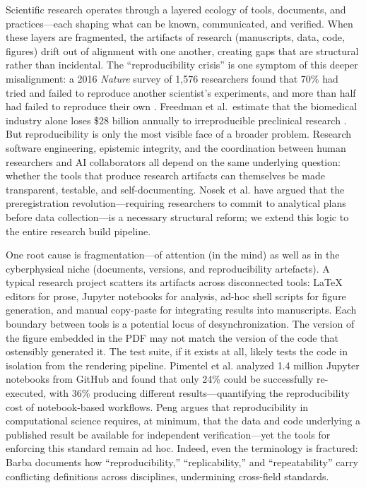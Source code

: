 \documentclass[
]{article}
\begin{document}
Scientific research operates through a layered ecology of tools,
documents, and practices---each shaping what can be known, communicated,
and verified. When these layers are fragmented, the artifacts of
research (manuscripts, data, code, figures) drift out of alignment with
one another, creating gaps that are structural rather than incidental.
The ``reproducibility crisis'' is one symptom of this deeper
misalignment: a 2016 \emph{Nature} survey of 1,576 researchers found
that 70\% had tried and failed to reproduce another scientist's
experiments, and more than half had failed to reproduce their own
\citep{baker2016reproducibility}. Freedman et al.~estimate that the
biomedical industry alone loses \$28 billion annually to irreproducible
preclinical research \citep{freedman2015economics}. But reproducibility
is only the most visible face of a broader problem. Research software
engineering, epistemic integrity, and the coordination between human
researchers and AI collaborators all depend on the same underlying
question: whether the tools that produce research artifacts can
themselves be made transparent, testable, and self-documenting. Nosek et
al. \citep{nosek2018preregistration} have argued that the
preregistration revolution---requiring researchers to commit to
analytical plans before data collection---is a necessary structural
reform; we extend this logic to the entire research build pipeline.

One root cause is fragmentation---of attention (in the mind) as well as
in the cyberphysical niche (documents, versions, and reproducibility
artefacts). A typical research project scatters its artifacts across
disconnected tools: LaTeX editors \citep{lamport1994latex} for prose,
Jupyter notebooks for analysis, ad-hoc shell scripts for figure
generation, and manual copy-paste for integrating results into
manuscripts. Each boundary between tools is a potential locus of
desynchronization. The version of the figure embedded in the PDF may not
match the version of the code that ostensibly generated it. The test
suite, if it exists at all, likely tests the code in isolation from the
rendering pipeline. Pimentel et al. \citep{pimentel2019jupyter} analyzed
1.4 million Jupyter notebooks from GitHub and found that only 24\% could
be successfully re-executed, with 36\% producing different
results---quantifying the reproducibility cost of notebook-based
workflows. Peng \citep{peng2011reproducible} argues that reproducibility
in computational science requires, at minimum, that the data and code
underlying a published result be available for independent
verification---yet the tools for enforcing this standard remain ad hoc.
Indeed, even the terminology is fractured: Barba
\citep{barba2018terminologies} documents how ``reproducibility,''
``replicability,'' and ``repeatability'' carry conflicting definitions
across disciplines, undermining cross-field standards.
\end{document}
